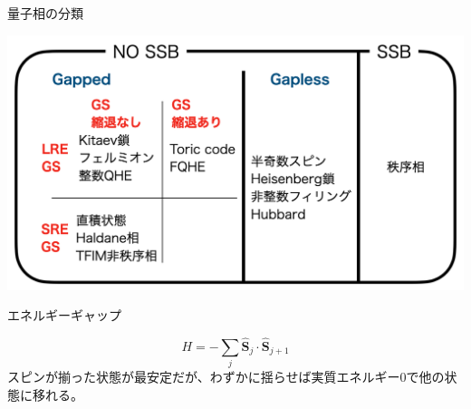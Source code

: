 \documentclass[dvipdfm]{beamer}
\begin{document}
\begin{frame}{量子相の分類}
    \begin{center}
        \includegraphics[width=\linewidth]{phase-diag.png}
    \end{center}
\end{frame}

\begin{frame}{エネルギーギャップ}
    \begin{example}
        \begin{equation*}
            H=-\sum_j\hat{\bm{S}}_j\cdot\hat{\bm{S}}_{j+1}
        \end{equation*}
        スピンが揃った状態が最安定だが、わずかに揺らせば実質エネルギー0で他の状態に移れる。
        \begin{figure}
            \centering
        \end{figure}
    \end{example}
    \alert{}
\end{frame}
\end{document}
